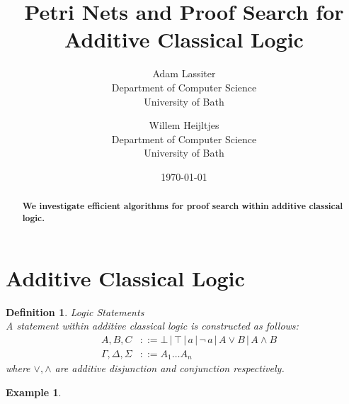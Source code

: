\documentclass[twocolumn]{article}
\title{Petri Nets and Proof Search for Additive Classical Logic}
\author{Adam Lassiter\\Department of Computer Science\\University of Bath \and Willem Heijltjes\\Department of Computer Science\\University of Bath}
\date{\today}
\def\defeq{::=}
\theoremstyle{indented}
\newtheorem{definition}[sec-ctr]{Definition}
\newtheorem*{example*}{Example}
\begin{document}
    \maketitle
    \begin{abstract}
        \textbf{We investigate efficient algorithms for proof search within additive classical logic.}
    \end{abstract}

    \section{Additive Classical Logic}

        \begin{definition}{Logic Statements\\}
            A \textit{statement} within additive classical logic is constructed as follows:
            \begin{align*}
                \quad A, B, C                &\defeq \bot \,|\, \top \,|\, a \,|\, \neg\, a \,|\, A \vee B \,|\, A \wedge B \\
                \quad \Gamma, \Delta, \Sigma &\defeq A_1 \ldots A_n
            \end{align*}
            where $\vee, \wedge$ are additive disjunction and conjunction respectively.
        \end{definition}

        \begin{example*}
        \end{example*}
\end{document}
